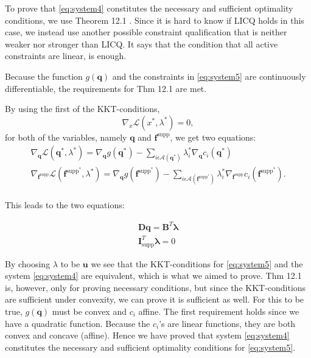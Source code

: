 To prove that \eqref{eq:system4} constitutes the necessary and sufficient optimality conditions, we use Theorem 12.1 \cite{NW}. Since it is hard to know if LICQ holds in this case, we instead use another possible constraint qualification that is neither weaker nor stronger than LICQ. It says that the condition that all active constraints are linear, is enough. 

Because the function $g(\bm{q})$ and the constraints in \eqref{eq:system5} are continuously differentiable, the requirements for Thm 12.1 are met.

By using the first of the KKT-conditions,
\begin{equation}
\nabla_{x}\mathcal{L}(x^{\ast},\lambda^{\ast}) = 0,
\end{equation}
for both of the variables, namely $\bm{q}$ and $\bm{f}^{\textrm{supp}}$, we get two equations:
\begin{equation}
\begin{aligned}
\nabla_{\bm{q}}\mathcal{L}(\bm{q}^{\ast},\lambda^{\ast}) = \nabla_{\bm{q}}g(\bm{q^{\ast}}) - \sum_{i\epsilon\mathcal{A}(\bm{q}^{\ast})}\lambda_{i}^{\ast}\nabla_{\bm{q}}c_{i}(\bm{q}^{\ast}) \\
\nabla_{\bm{f}^{\textrm{supp}}}\mathcal{L}(\bm{f}^{\textrm{supp}^{\ast}}, \lambda^{\ast}) = \nabla_{\bm{q}}g(\bm{f}^{\textrm{supp}^{\ast}}) - \sum_{i\epsilon\mathcal{A}(\bm{f}^{\textrm{supp}^{\ast}})}\lambda_{i}^{\ast}\nabla_{\bm{f}^{\textrm{supp}}}c_{i}(\bm{f}^{\textrm{supp}^{\ast}}).\\
\end{aligned}
\end{equation}

This leads to the two equations:

\begin{equation}
\begin{aligned}
\bm{Dq} = \bm{B}^{T}\bm{\lambda}\\
\bm{I}^{T}_{\textrm{supp}}\bm{\lambda} = 0
\end{aligned}
\end{equation}

By choosing $\lambda$ to be $\bm{u}$ we see that the KKT-conditions for \eqref{eq:system5} and the system \eqref{eq:system4} are equivalent, which is what we aimed to prove. Thm 12.1 is, however, only for proving necessary conditions, but since the KKT-conditions are sufficient under convexity, we can prove it is sufficient as well. For this to be true, $g(\bm{q})$ must be convex and $c_{i}$ affine. The first requirement holds since we have a quadratic function. Because the $c_{i}$'s are linear functions, they are both convex and concave (affine). Hence we have proved that system \eqref{eq:system4} constitutes the necessary and sufficient optimality conditions for \eqref{eq:system5}.